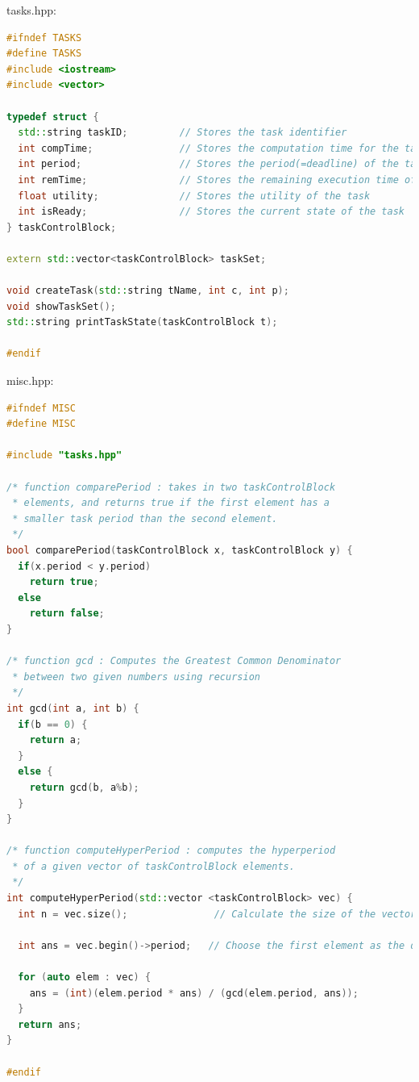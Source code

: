 tasks.hpp:
\begin{lstlisting}[language=C++, frame=single]
#ifndef TASKS
#define TASKS
#include <iostream>
#include <vector>

typedef struct {
  std::string taskID;         // Stores the task identifier
  int compTime;               // Stores the computation time for the task
  int period;                 // Stores the period(=deadline) of the task
  int remTime;                // Stores the remaining execution time of the task
  float utility;              // Stores the utility of the task
  int isReady;                // Stores the current state of the task
} taskControlBlock;

extern std::vector<taskControlBlock> taskSet;

void createTask(std::string tName, int c, int p);
void showTaskSet();
std::string printTaskState(taskControlBlock t);

#endif
\end{lstlisting}

misc.hpp:
\begin{lstlisting}[language=C++, frame=single]
#ifndef MISC
#define MISC

#include "tasks.hpp"

/* function comparePeriod : takes in two taskControlBlock
 * elements, and returns true if the first element has a
 * smaller task period than the second element.
 */
bool comparePeriod(taskControlBlock x, taskControlBlock y) {
  if(x.period < y.period)
    return true;
  else
    return false;
}

/* function gcd : Computes the Greatest Common Denominator
 * between two given numbers using recursion
 */
int gcd(int a, int b) {
  if(b == 0) {
    return a;
  }
  else {
    return gcd(b, a%b);
  }
}

/* function computeHyperPeriod : computes the hyperperiod
 * of a given vector of taskControlBlock elements.
 */
int computeHyperPeriod(std::vector <taskControlBlock> vec) {
  int n = vec.size();               // Calculate the size of the vector

  int ans = vec.begin()->period;   // Choose the first element as the default answer

  for (auto elem : vec) {
    ans = (int)(elem.period * ans) / (gcd(elem.period, ans));
  }
  return ans;
}

#endif
\end{lstlisting}


